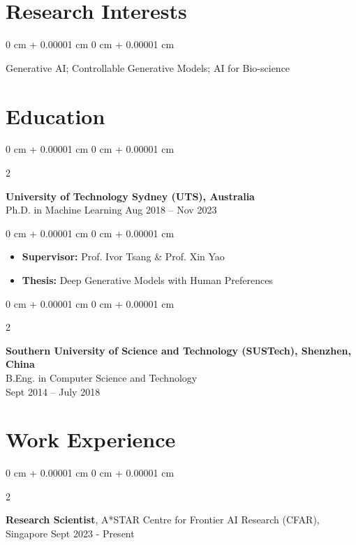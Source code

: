 \documentclass[10pt, letterpaper]{article}
\newenvironment{highlights}{
    \begin{itemize}[
        topsep=0.10 cm,
        parsep=0.10 cm,
        partopsep=0pt,
        itemsep=0pt,
        leftmargin=0 cm + 10pt
    ]
}{
    \end{itemize}
} %
\newenvironment{onecolentry}{
    \begin{adjustwidth}{
        0 cm + 0.00001 cm
    }{
        0 cm + 0.00001 cm
    }
}{
    \end{adjustwidth}
} %
\newenvironment{twocolentry}[2][]{
    \onecolentry
    \def\secondColumn{#2}
    \setcolumnwidth{\fill, 4.5 cm}
    \begin{paracol}{2}
}{
    \switchcolumn \raggedleft \secondColumn
    \end{paracol}
    \endonecolentry
} %
\begin{document}
\section{Research Interests} 
    \begin{onecolentry}
        Generative AI; Controllable Generative Models; AI for Bio-science 
    \end{onecolentry}

\section{Education}        
    \begin{twocolentry}{
        Aug 2018 – Nov 2023
    }
        \textbf{University of Technology Sydney (UTS), Australia} \\Ph.D. in Machine Learning\end{twocolentry}

    \begin{onecolentry}
        \begin{highlights}
            \item \textbf{Supervisor:} Prof. Ivor Tsang \& Prof. Xin Yao
            \item \textbf{Thesis:} Deep Generative Models with Human Preferences
        \end{highlights}
    \end{onecolentry}

    \vspace{0.2 cm}
    
    \begin{twocolentry}{
        Sept 2014 – July 2018
    }
        \textbf{Southern University of Science and Technology (SUSTech), Shenzhen, China} \\
        B.Eng. in Computer Science and Technology\\
    \end{twocolentry}

\section{Work Experience}
    
    \begin{twocolentry}{
        Sept 2023 - Present
    }
        \textbf{Research Scientist}, A*STAR Centre for Frontier AI Research (CFAR), Singapore\end{twocolentry}
\end{document}
